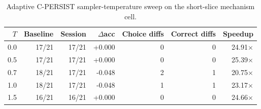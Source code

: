 \begin{table}[H]
\centering
\caption{Adaptive C-PERSIST sampler-temperature sweep on the short-slice mechanism cell.}
\label{tab:c-persist-sampler-stability}
\scriptsize
\renewcommand{\arraystretch}{\PaperTableStretch}
\begin{tabular}{@{}r r r r r r r@{}}
\toprule
\(T\) & Baseline & Session & \(\Delta\)acc & Choice diffs & Correct diffs & Speedup \\
\midrule
0.0 & 17/21 & 17/21 & +0.000 & 0 & 0 & 24.91$\times$ \\
0.5 & 17/21 & 17/21 & +0.000 & 0 & 0 & 25.39$\times$ \\
0.7 & 18/21 & 17/21 & -0.048 & 2 & 1 & 20.75$\times$ \\
1.0 & 18/21 & 17/21 & -0.048 & 1 & 1 & 23.17$\times$ \\
1.5 & 16/21 & 16/21 & +0.000 & 0 & 0 & 24.66$\times$ \\
\bottomrule
\end{tabular}
\end{table}
